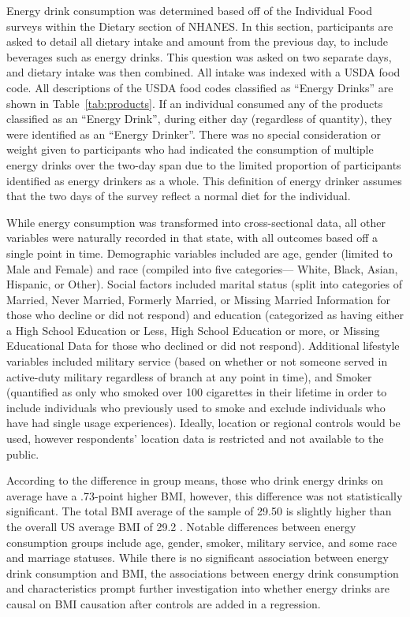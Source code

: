 \documentclass[12pt]{article}
\begin{document}
Energy drink consumption was determined based off of the Individual Food surveys within the Dietary section of NHANES. In this section, participants are asked to detail all dietary intake and amount from the previous day, to include beverages such as energy drinks. This question was asked on two separate days, and dietary intake was then combined. All intake was indexed with a USDA food code. All descriptions of the USDA food codes classified as ``Energy Drinks'' are shown in Table~\ref{tab:products}. If an individual consumed any of the products classified as an ``Energy Drink'', during either day (regardless of quantity), they were identified as an ``Energy Drinker''. There was no special consideration or weight given to participants who had indicated the consumption of multiple energy drinks over the two-day span due to the limited proportion of participants identified as energy drinkers as a whole. This definition of energy drinker assumes that the two days of the survey reflect a normal diet for the individual.



While energy consumption was transformed into cross-sectional data, all other variables were naturally recorded in that state, with all outcomes based off a single point in time. Demographic variables included are age, gender (limited to Male and Female) and race (compiled into five categories--- White, Black, Asian, Hispanic, or Other). Social factors included marital status (split into categories of Married, Never Married, Formerly Married, or Missing Married Information for those who decline or did not respond) and education (categorized as having either a High School Education or Less, High School Education or more, or Missing Educational Data for those who declined or did not respond). Additional lifestyle variables included military service (based on whether or not someone served in active-duty military regardless of branch at any point in time), and Smoker (quantified as only who smoked over 100 cigarettes in their lifetime in order to include individuals who previously used to smoke and exclude individuals who have had single usage experiences). Ideally, location or regional controls would be used, however respondents' location data is restricted and not available to the public.



According to the difference in group means, those who drink energy drinks on average have a .73-point higher BMI, however, this difference was not statistically significant. The total BMI average of the sample of 29.50 is slightly higher than the overall US average BMI of 29.2 \citep{young2023}. Notable differences between energy consumption groups include age, gender, smoker, military service, and some race and marriage statuses. While there is no significant association between energy drink consumption and BMI, the associations between energy drink consumption and characteristics prompt further investigation into whether energy drinks are causal on BMI causation after controls are added in a regression.
\end{document}
